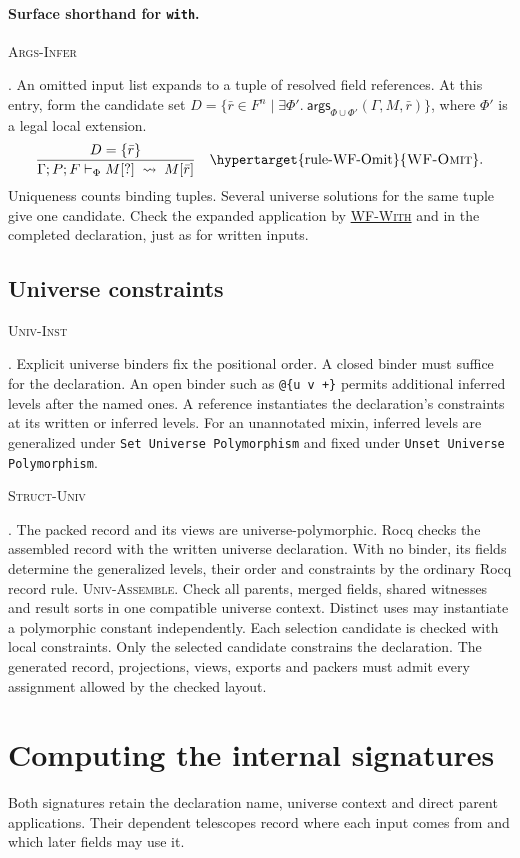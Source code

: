 \documentclass{article}
\newcommand{\ttt}[1]{\texttt{#1}}
\newcommand{\rdefn}[1]{\hypertarget{rule-#1}{\textsc{#1}}}
\newcommand{\ruse}[1]{\hyperlink{rule-#1}{\textsc{#1}}}
\begin{document}
\paragraph{Surface shorthand for \ttt{with}.}
\rdefn{Args-Infer}. An omitted input list expands to a tuple of resolved
field references. At this entry, form the candidate set
$D=\{\bar r\in F^n\mid\exists\Phi'.\
\mathsf{args}_{\Phi\cup\Phi'}(\Gamma,M,\bar r)\}$, where $\Phi'$ is a
legal local extension.
\[
 \frac{D=\{\bar r\}}
      {\Gamma;P;F\vdash_\Phi M[?]\;\leadsto\;M[\bar r]}
 \quad\text{\rdefn{WF-Omit}} .
\]
Uniqueness counts binding tuples. Several universe solutions for the
same tuple give one candidate. Check the expanded application by
\ruse{WF-With} and in the completed declaration, just as for written inputs.

\subsection{Universe constraints}
\label{sec:univ}

\rdefn{Univ-Inst}. Explicit universe binders fix the positional order.
A closed binder must suffice for the declaration. An open binder such
as \verb|@{u v +}| permits additional inferred levels after the named
ones. A reference instantiates the declaration's constraints at its
written or inferred levels. For an unannotated mixin, inferred levels
are generalized under \ttt{Set Universe Polymorphism} and fixed under
\ttt{Unset Universe Polymorphism}.

\rdefn{Struct-Univ}. The packed record and its views are universe-polymorphic.
Rocq checks the assembled record with the written universe declaration.
With no binder, its fields determine the generalized levels, their order and
constraints by the ordinary Rocq record rule.
\rdefn{Univ-Assemble}. Check all parents, merged fields, shared witnesses
and result sorts in one compatible universe context. Distinct uses may
instantiate a polymorphic constant independently. Each selection candidate
is checked with local constraints. Only the selected candidate constrains
the declaration. The generated record, projections, views, exports and
packers must admit every assignment allowed by the checked layout.

\section{Computing the internal signatures}
\label{sec:signatures}
Both signatures retain the declaration name, universe context and direct
parent applications. Their dependent telescopes record where each input
comes from and which later fields may use it.
\end{document}

